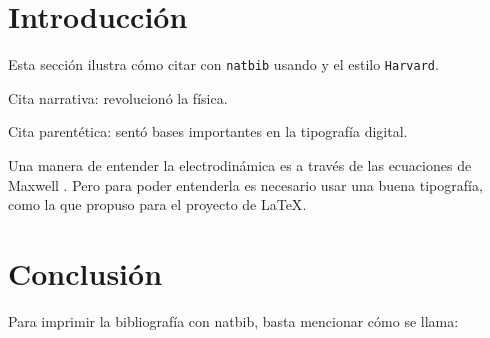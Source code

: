 \documentclass{article}
\begin{document}
\section{Introducción}

Esta sección ilustra cómo citar con \texttt{natbib} usando 
y el estilo \texttt{Harvard}.

Cita narrativa: \cite{einstein1905} revolucionó la física.

Cita parentética: \citep{knuth1984} sentó bases importantes 
en la tipografía digital.

Una manera de entender la electrodinámica es a través de las ecuaciones de Maxwell \citep{einstein1905}. Pero para poder entenderla es necesario usar una buena tipografía, como la que propuso \citet{knuth1984} para el proyecto de \LaTeX \citep{latexproject}.

\section{Conclusión}

Para imprimir la bibliografía con natbib, basta mencionar cómo se llama:



\end{document}
